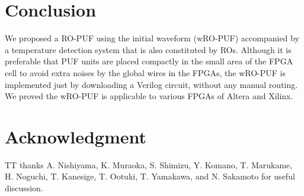 ﻿\documentclass[aps,preprint,prb,superscriptaddress,amsmath,showpacs,tightenlines]{revtex4}
\begin{document}
\section{Conclusion}
We proposed a RO-PUF using 
the initial waveform (wRO-PUF) accompanied by 
a temperature detection system that 
is also constituted by ROs.
Although it is preferable that PUF units are placed compactly in the 
 small area of the FPGA cell to avoid 
extra noises by the global wires in the FPGAs,
the wRO-PUF is implemented just by 
downloading a Verilog circuit, without any manual routing.
We proved the wRO-PUF is applicable to various FPGAs
of Altera and Xilinx. 

 

\section*{Acknowledgment}
TT thanks A. Nishiyama, K. Muraoka, S. Shimizu, 
Y. Komano, T. Marukame, H. Noguchi, T. Kanesige, T. Ootuki,
T. Yamakawa, and N. Sakamoto for useful discussion.
\end{document}
